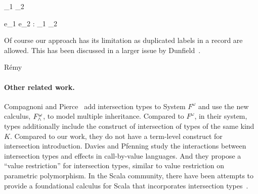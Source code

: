 {\turnsrec \ty_1 \intersects \ty_2}

{\Gamma \turns e_1 \dcomma e_2 : \ty_1 \intersects \ty_2 }

Of course our approach has its limitation as duplicated labels in a record are
allowed. This has been discussed in a larger issue by
Dunfield~\cite{dunfield2014elaborating}.

R{\'e}my~\cite{remy1989type}

\paragraph{Other related work.}

Compagnoni and Pierce~\cite{compagnoni1996higher} add intersection types to
System $ F^{\omega} $ and use the new calculus, $ F^{\omega}_{\wedge} $, to
model multiple inheritance. Compared to $ F^{\omega} $, in their system, types
additionally include the construct of intersection of types of the same kind
$ K $. Compared to our work, they do not have a term-level construct for
intersection introduction. Davies and Pfenning \cite{davies2000intersection}
study the interactions between intersection types and effects in call-by-value
languages. And they propose a ``value restriction'' for intersection types,
similar to value restriction on parametric polymorphism. In the Scala community,
there have been attempts to provide a foundational calculus for Scala that
incorporates intersection types~\cite{amin2014foundations,amin2012dependent}.
